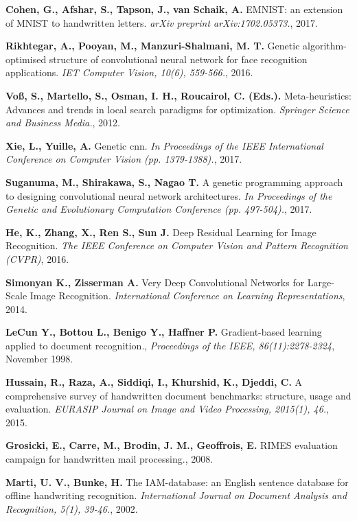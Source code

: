 \documentclass[eng]{simposium}
\begin{document}
\begin{thebibliography}{99}
\textbf{Cohen, G., Afshar, S., Tapson, J., van Schaik, A.} EMNIST: an extension of MNIST to handwritten letters. \emph{arXiv preprint arXiv:1702.05373.}, 2017.

\textbf{Rikhtegar, A., Pooyan, M., Manzuri-Shalmani, M. T.} Genetic algorithm-optimised structure of convolutional neural network for face recognition applications. \emph{IET Computer Vision, 10(6), 559-566.}, 2016.

\textbf{Voß, S., Martello, S., Osman, I. H., Roucairol, C. (Eds.).} Meta-heuristics: Advances and trends in local search paradigms for optimization. \emph{Springer Science and Business Media.}, 2012.

\textbf{Xie, L., Yuille, A. } Genetic cnn. \emph{In Proceedings of the IEEE International Conference on Computer Vision (pp. 1379-1388).}, 2017.

\textbf{Suganuma, M., Shirakawa, S., Nagao T. } A genetic programming approach to designing convolutional neural network architectures. \emph{In Proceedings of the Genetic and Evolutionary Computation Conference (pp. 497-504).}, 2017.

\textbf{He, K., Zhang, X., Ren S., Sun J.} Deep Residual Learning for Image Recognition. \emph{The IEEE Conference on Computer Vision and Pattern Recognition (CVPR)}, 2016.

\textbf{Simonyan K., Zisserman A.} Very Deep Convolutional Networks for Large-Scale Image Recognition. \emph{International Conference on Learning Representations}, 2014.

\textbf{LeCun Y., Bottou L., Benigo Y., Haffner P.} Gradient-based learning applied to document recognition., \emph{Proceedings of the IEEE, 86(11):2278-2324}, November 1998.

\textbf{Hussain, R., Raza, A., Siddiqi, I., Khurshid, K., Djeddi, C.} A comprehensive survey of handwritten document benchmarks: structure, usage and evaluation. \emph{EURASIP Journal on Image and Video Processing, 2015(1), 46.}, 2015.

\textbf{Grosicki, E., Carre, M., Brodin, J. M., Geoffrois, E.} RIMES evaluation campaign for handwritten mail processing., 2008.

\textbf{Marti, U. V., Bunke, H.} The IAM-database: an English sentence database for offline handwriting recognition. \emph{International Journal on Document Analysis and Recognition, 5(1), 39-46.}, 2002.


\end{thebibliography}
\end{document}
